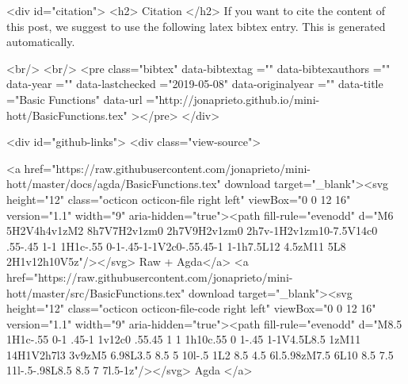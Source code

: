   
  <div id="citation">
  <h2> Citation </h2>
  If you want to cite the content of this post,
  we suggest to use the following latex bibtex entry.
  This is generated automatically.

  <br/>
  <br/>
  <pre class="bibtex"
       data-bibtextag =""
       data-bibtexauthors =""
       data-year =""
       data-lastchecked ="2019-05-08"
       data-originalyear =""
       data-title ="Basic Functions"
       data-url ="http://jonaprieto.github.io/mini-hott/BasicFunctions.tex"
  ></pre>
  </div>
  

  <div id="github-links">
    <div class="view-source">
      
        <a href="https://raw.githubusercontent.com/jonaprieto/mini-hott/master/docs/agda/BasicFunctions.tex" download target="_blank"><svg height="12" class="octicon octicon-file right left" viewBox="0 0 12 16" version="1.1" width="9" aria-hidden="true"><path fill-rule="evenodd" d="M6 5H2V4h4v1zM2 8h7V7H2v1zm0 2h7V9H2v1zm0 2h7v-1H2v1zm10-7.5V14c0 .55-.45 1-1 1H1c-.55 0-1-.45-1-1V2c0-.55.45-1 1-1h7.5L12 4.5zM11 5L8 2H1v12h10V5z"/></svg> Raw + Agda</a>
        <a href="https://raw.githubusercontent.com/jonaprieto/mini-hott/master/src/BasicFunctions.tex" download target="_blank"><svg height="12" class="octicon octicon-file-code right left" viewBox="0 0 12 16" version="1.1" width="9" aria-hidden="true"><path fill-rule="evenodd" d="M8.5 1H1c-.55 0-1 .45-1 1v12c0 .55.45 1 1 1h10c.55 0 1-.45 1-1V4.5L8.5 1zM11 14H1V2h7l3 3v9zM5 6.98L3.5 8.5 5 10l-.5 1L2 8.5 4.5 6l.5.98zM7.5 6L10 8.5 7.5 11l-.5-.98L8.5 8.5 7 7l.5-1z"/></svg> Agda </a>
      
